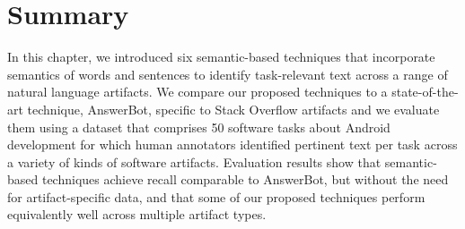 \section{Summary}
\label{cp5:summary}



In this chapter, we introduced six semantic-based techniques 
that incorporate semantics of words and sentences
to identify task-relevant text across a range of natural language artifacts.
We compare our proposed techniques to a state-of-the-art technique, AnswerBot,
specific to Stack Overflow artifacts and 
we evaluate them using a dataset that comprises  50 software tasks about Android development for
which human annotators identified pertinent text per task across a variety of kinds of software
artifacts.
Evaluation results show that semantic-based techniques 
achieve recall comparable to AnswerBot, but without the need for artifact-specific data, 
and that some of our proposed techniques perform equivalently well across
multiple artifact types. 